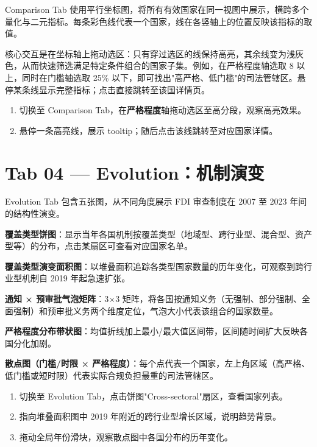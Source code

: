 \documentclass[12pt,a4paper]{article}
\begin{document}
Comparison Tab 使用平行坐标图，将所有有效国家在同一视图中展示，横跨多个量化与二元指标。每条彩色线代表一个国家，线在各竖轴上的位置反映该指标的取值。

核心交互是在坐标轴上拖动选区：只有穿过选区的线保持高亮，其余线变为浅灰色，从而快速筛选满足特定条件组合的国家子集。例如，在严格程度轴选取 8 以上，同时在门槛轴选取 25\% 以下，即可找出"高严格、低门槛"的司法管辖区。悬停某条线显示完整指标；点击直接跳转至该国详情页。

\begin{demobox}
  \begin{enumerate}
    \item 切换至 Comparison Tab，在\textbf{严格程度}轴拖动选区至高分段，观察高亮效果。
    \item 悬停一条高亮线，展示 tooltip；随后点击该线跳转至对应国家详情。
  \end{enumerate}
\end{demobox}

\section{Tab 04 — Evolution：机制演变}

Evolution Tab 包含五张图，从不同角度展示 FDI 审查制度在 2007 至 2023 年间的结构性演变。

\textbf{覆盖类型饼图}：显示当年各国机制按覆盖类型（地域型、跨行业型、混合型、资产型等）的分布，点击某扇区可查看对应国家名单。

\textbf{覆盖类型演变面积图}：以堆叠面积追踪各类型国家数量的历年变化，可观察到跨行业型机制自 2019 年起急速扩张。

\textbf{通知 × 预审批气泡矩阵}：3×3 矩阵，将各国按通知义务（无强制、部分强制、全面强制）和预审批义务两个维度定位，气泡大小代表该组合的国家数量。

\textbf{严格程度分布带状图}：均值折线加上最小/最大值区间带，区间随时间扩大反映各国分化加剧。

\textbf{散点图（门槛/时限 × 严格程度）}：每个点代表一个国家，左上角区域（高严格、低门槛或短时限）代表实际合规负担最重的司法管辖区。

\begin{demobox}
  \begin{enumerate}
    \item 切换至 Evolution Tab，点击饼图"Cross-sectoral"扇区，查看国家列表。
    \item 指向堆叠面积图中 2019 年附近的跨行业型增长区域，说明趋势背景。
    \item 拖动全局年份滑块，观察散点图中各国分布的历年变化。
  \end{enumerate}
\end{demobox}
\end{document}
